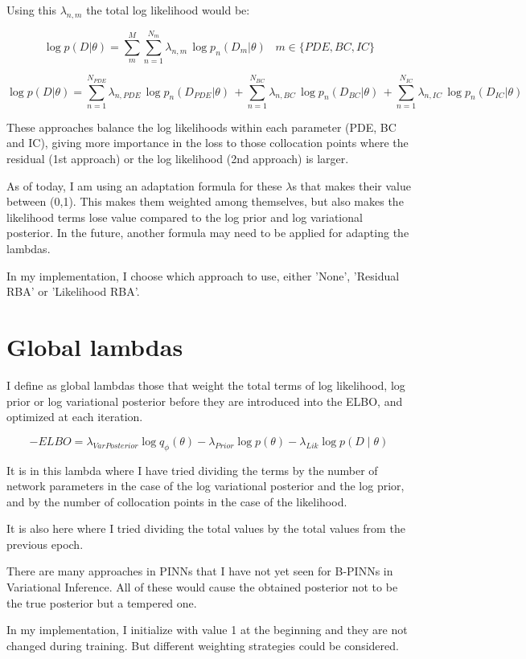\documentclass{article}
\begin{document}
Using this $\lambda_{n,m}$ the total log likelihood would be:

$$
\log p(D|\theta) = \sum_{m}^{M} \sum_{n=1}^{N_m} \lambda_{n,m}\,\log p_n(D_{m}|\theta) \;\;\;m\in \{PDE, BC, IC\}
$$

$$
\log p(D|\theta) = \sum_{n=1}^{N_{PDE}} \lambda_{n,PDE}\,\log p_n(D_{PDE}|\theta) \, + 
\sum_{n=1}^{N_{BC}} \lambda_{n,BC}\,\log p_n(D_{BC}|\theta) \, +
\sum_{n=1}^{N_{IC}} \lambda_{n,IC}\,\log p_n(D_{IC}|\theta)
$$

These approaches balance the log likelihoods within each parameter (PDE, BC and IC), giving more importance in the loss to those collocation points where the residual (1st approach) or the log likelihood (2nd approach) is larger.

As of today, I am using an adaptation formula for these $\lambda$s that makes their value between (0,1). This makes them weighted among themselves, but also makes the likelihood terms lose value compared to the log prior and log variational posterior. In the future, another formula may need to be applied for adapting the lambdas.

In my implementation, I choose which approach to use, either 'None', 'Residual RBA' or 'Likelihood RBA'.

\section{Global lambdas}

I define as global lambdas those that weight the total terms of log likelihood, log prior or log variational posterior before they are introduced into the ELBO, and optimized at each iteration.

$$
-ELBO = \lambda_{VarPosterior}\log{q_{\phi}(\theta)} - \lambda_{Prior}\log {p(\theta)} - \lambda_{Lik}\log{{p(D\mid\theta)}}
$$

It is in this lambda where I have tried dividing the terms by the number of network parameters in the case of the log variational posterior and the log prior, and by the number of collocation points in the case of the likelihood.

It is also here where I tried dividing the total values by the total values from the previous epoch.

There are many approaches in PINNs that I have not yet seen for B-PINNs in Variational Inference. All of these would cause the obtained posterior not to be the true posterior but a tempered one.

In my implementation, I initialize with value 1 at the beginning and they are not changed during training. But different weighting strategies could be considered.
\end{document}
